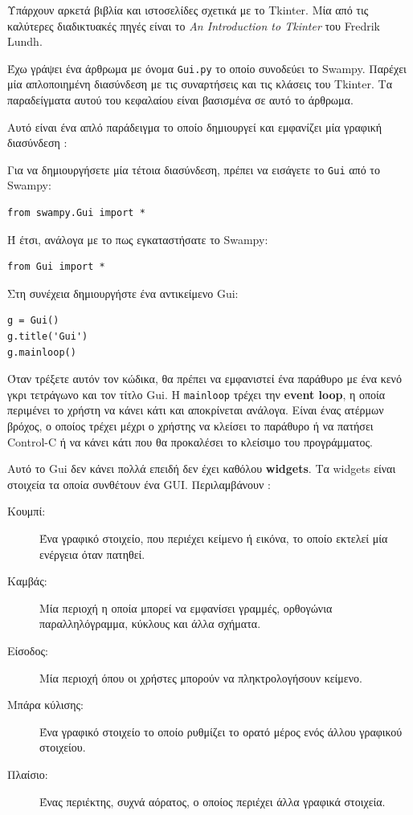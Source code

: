 \documentclass[10pt]{book}
\begin{document}
Υπάρχουν αρκετά βιβλία και ιστοσελίδες σχετικά με το  Tkinter.  Μία από τις 
καλύτερες διαδικτυακές πηγές είναι το  {\em An Introduction to Tkinter}  του  
Fredrik Lundh.

 Έχω γράψει ένα άρθρωμα με όνομα  {\tt Gui.py}  το οποίο συνοδεύει το  
Swampy.   Παρέχει μία απλοποιημένη διασύνδεση με τις συναρτήσεις και τις κλάσεις του 
 Tkinter.   Τα παραδείγματα αυτού του κεφαλαίου είναι βασισμένα σε αυτό το άρθρωμα.

Αυτό είναι ένα απλό παράδειγμα το οποίο δημιουργεί και εμφανίζει μία γραφική διασύνδεση :

 Για να δημιουργήσετε μία τέτοια διασύνδεση, πρέπει να εισάγετε το  {\tt Gui}  από 
το  Swampy:
%
\begin{verbatim}
from swampy.Gui import *
\end{verbatim}
%
 Ή έτσι, ανάλογα με το πως εγκαταστήσατε το  Swampy:
%
\begin{verbatim}
from Gui import *
\end{verbatim}
%
 Στη συνέχεια δημιουργήστε ένα αντικείμενο  Gui:
%
\begin{verbatim}
g = Gui()
g.title('Gui')
g.mainloop()
\end{verbatim}
%
 Όταν τρέξετε αυτόν τον κώδικα, θα πρέπει να εμφανιστεί ένα παράθυρο με ένα κενό γκρι 
τετράγωνο και τον τίτλο  {\sf Gui}.   Η  {\tt mainloop}  τρέχει την  
{\bf event loop},  η οποία περιμένει το χρήστη να κάνει κάτι και αποκρίνεται ανάλογα.  
Είναι ένας ατέρμων βρόχος, ο οποίος τρέχει μέχρι ο χρήστης να κλείσει το παράθυρο ή να 
πατήσει  Control-C  ή να κάνει κάτι που θα προκαλέσει το κλείσιμο του προγράμματος.

Αυτό το  Gui  δεν κάνει πολλά επειδή δεν έχει καθόλου  {\bf widgets}.   
Τα  widgets  είναι στοιχεία τα οποία συνθέτουν ένα  GUI.   Περιλαμβάνουν :

 
\begin{description}

\item[Κουμπί:] Ένα γραφικό στοιχείο, που περιέχει κείμενο ή εικόνα, το οποίο 
εκτελεί μία ενέργεια όταν πατηθεί.

\item[Καμβάς:] Μία περιοχή η οποία μπορεί να εμφανίσει γραμμές, ορθογώνια παραλληλόγραμμα, 
κύκλους και άλλα σχήματα.

\item[Είσοδος:] Μία περιοχή όπου οι χρήστες μπορούν να πληκτρολογήσουν κείμενο.

\item[Μπάρα κύλισης:] Ένα γραφικό στοιχείο το οποίο ρυθμίζει το ορατό μέρος ενός άλλου 
γραφικού στοιχείου.

\item[Πλαίσιο:] Ένας περιέκτης, συχνά αόρατος, ο οποίος περιέχει άλλα γραφικά στοιχεία.

\end{description}
\end{document}
